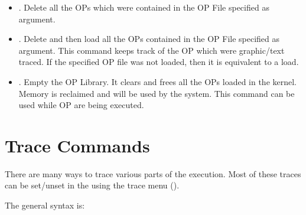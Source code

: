 \begin{itemize}
\item {}. Delete all the OPs which
were contained in the OP File specified as argument.

\item {}.  Delete and then load all the OPs
contained in the OP File specified as argument. This command keeps track of the
OP which were graphic/text traced. If the specified OP file was not loaded,
then it is equivalent to a load.

\item {}. Empty the OP Library. It clears and frees all the
OPs loaded in the kernel. Memory is reclaimed and will be used by the
system. This command can be used while OP are being executed.

\end{itemize}

\section{\CPK{} Trace Commands}

There are many ways to trace various parts of the \CPK{} execution.
Most of these traces can be set/unset in the \XPK{} using the trace
menu (). 

The general syntax is:


